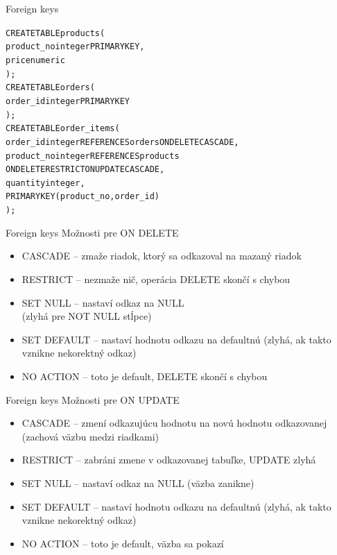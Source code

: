 \documentclass[12pt]{beamer}
\def\blue#1{\textcolor{Cerulean}{#1}}
\begin{document}
\begin{frame}[fragile]{Foreign keys}
\hbox{}{\small
\begin{alltt}
CREATE TABLE products (
  product_no integer PRIMARY KEY,
  price numeric
);
CREATE TABLE orders (
  order_id integer PRIMARY KEY
);
CREATE TABLE order_items (
  order_id integer \alert{REFERENCES orders} \blue{ON DELETE CASCADE},
  product_no integer \alert{REFERENCES products}
      \blue{ON DELETE RESTRICT ON UPDATE CASCADE},
  quantity integer,
  PRIMARY KEY (product_no, order_id)
);
\end{alltt}
}
\end{frame}

\begin{frame}[fragile]{Foreign keys}
Možnosti pre \blue{ON DELETE}
\begin{itemize}
\item \alert{CASCADE} -- zmaže riadok, ktorý sa odkazoval na mazaný riadok
\item \alert{RESTRICT} -- nezmaže nič, operácia DELETE skončí s chybou
\item SET NULL -- nastaví odkaz na NULL\\ (zlyhá pre NOT NULL stĺpce)
\item SET DEFAULT -- nastaví hodnotu odkazu na defaultnú
(zlyhá, ak takto vznikne nekorektný odkaz)
\item NO ACTION -- toto je default, DELETE skončí s chybou
\end{itemize}
\end{frame}

\begin{frame}[fragile]{Foreign keys}
Možnosti pre \blue{ON UPDATE}
\begin{itemize}
\item \alert{CASCADE} -- zmení odkazujúcu hodnotu na novú hodnotu odkazovanej
(zachová väzbu medzi riadkami)
\item RESTRICT -- zabráni zmene v odkazovanej tabuľke, UPDATE zlyhá
\item SET NULL -- nastaví odkaz na NULL (väzba zanikne)
\item SET DEFAULT -- nastaví hodnotu odkazu na defaultnú
(zlyhá, ak takto vznikne nekorektný odkaz)
\item NO ACTION -- toto je default, väzba sa pokazí
\end{itemize}
\end{frame}
\end{document}
